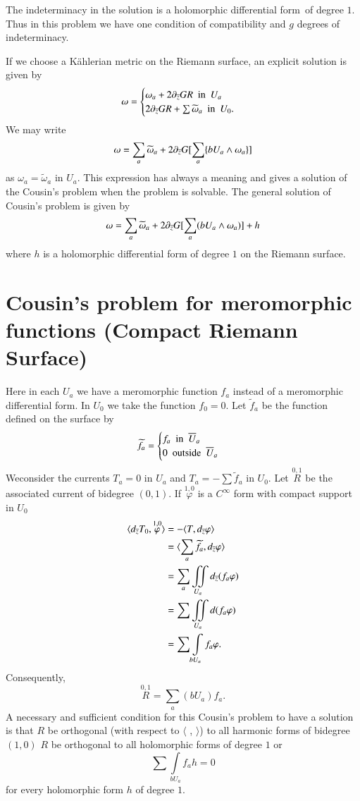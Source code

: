 The indeterminacy in the solution is a holomorphic differential
form\pageoriginale\ of degree $1$. Thus in this problem we have one
condition of compatibility and $g$ degrees of indeterminacy.

If we choose a K\"ahlerian metric on the Riemann surface, an explicit
solution is given by
$$
\omega=
\begin{cases}
\omega_{a}+2\partial_{\overline{z}}GR\text{ \  in \ } U_{a}\\
2\partial_{\overline{z}}GR+\sum\widetilde{\omega}_{a}\text{ \ in \ } U_{0}.
\end{cases}
$$
We may write
$$
\omega=\sum_{a}\widetilde{\omega}_{a}+2\partial_{\overline{z}}G[\sum_{a}\{bU_{a}\wedge\omega_{a}\}]
$$
as $\omega_{a}=\widetilde{\omega}_{a}$ in $U_{a}$. This expression has
always a meaning and gives a solution of the Cousin's problem when the
problem is solvable. The general solution of Cousin's problem is given
by
$$
\omega=\sum_{a}\widetilde{\omega}_{a}+2\partial_{\overline{z}}G[\sum_{a}(bU_{a}\wedge\omega_{a})]+h 
$$
where $h$ is a holomorphic differential form of degree $1$ on the
Riemann surface.

\section*{Cousin's problem for meromorphic functions\protect\hfil
\protect\break (Compact Riemann Surface)}

Here in each $U_{a}$ we have a meromorphic function $f_{a}$ instead of
a meromorphic differential form. In $U_{0}$ we take the function
$f_{0}=0$. Let $\tilde{f}_{a}$ be the function defined on the surface by
$$
\widetilde{f}_{a}=
\begin{cases}
f_{a} \text{ \  in \ } \overline{U}_{a}\\
0 \text{ \  outside \ } \overline{U}_{a}
\end{cases}
$$
We\pageoriginale consider the currents $T_{a}=0$ in $U_{a}$ and
$T_{a}=-\sum\widetilde{f}_{a}$ in $U_{0}$. Let $\overset{0,1}{R}$ be
the associated current of bidegree $(0,1)$. If
$\overset{1,0}{\varphi}$ is a $C^{\infty}$ form with compact support
in $U_{0}$
\begin{align*}
\langle d_{\overline{z}}T_{0},\overset{1,0}{\varphi}\rangle &= -\langle
T,d_{\overline{z}}\varphi\rangle\\ 
&= \langle\sum_{a}\widetilde{f}_{a},d_{\overline{z}}\varphi\rangle\\
&= \sum_{a}\iint\limits_{U_{a}}d_{\overline{z}}(f_{a}\varphi)\\
&= \sum \iint\limits_{U_{a}}d(f_{a}\varphi)\\
&= \sum\int\limits_{bU_{a}}f_{a}\varphi.
\end{align*}
Consequently,
$$
\overset{0,1}{R}=\sum_{a}(bU_{a})f_{a}.
$$
A necessary and sufficient condition for this Cousin's problem to have
a solution is that $R$ be orthogonal (with respect to $\langle$ ,
$\rangle$)
to all harmonic forms of bidegree $(1,0)$ \iec $R$ be orthogonal to
all holomorphic forms of degree $1$ or 
$$
\sum \int\limits_{bU_{a}}f_{a}h=0
$$
for every holomorphic form $h$ of degree $1$.

